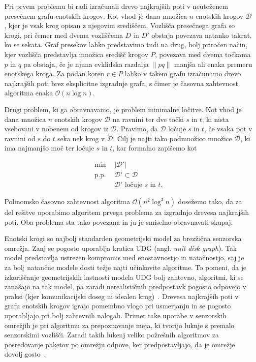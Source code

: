 \documentclass[a4paper, 12pt]{book}
\newcommand{\D}{\ensuremath{\mathcal{D}}}
\newcommand{\OO}{\ensuremath{\mathcal{O}}} %
\begin{document}
Pri prvem problemu bi radi izračunali drevo najkrajših poti v neuteženem presečnem grafu enotskih krogov. Kot vhod je dana množica $n$ enotskih krogov $\D$, kjer je vsak krog opisan z njegovim središčem. Vozlišča presečnega grafa so krogi, pri čemer med dvema vozliščema $D$ in $D'$ obstaja povezava natanko takrat, ko se sekata. Graf presekov lahko predstavimo tudi na drug, bolj priročen način, kjer vozlišča predstavlja množica središč krogov $P$, povezava med dvema točkama $p$ in $q$ pa obstaja, če je njuna evklidska razdalja $\|pq\|$ manjša ali enaka premeru enotskega kroga. Za podan koren $r \in P$ lahko v takem grafu izračunamo drevo najkrajših poti brez eksplicitne izgradnje grafa, s čimer je časovna zahtevnost algoritma enaka $\OO(n\log n)$.

Drugi problem, ki ga obravnavamo, je problem minimalne ločitve. Kot vhod je dana množica $n$ enotskih krogov $\D$ na ravnini ter dve točki $s$ in $t$, ki nista vsebovani v nobenem od krogov iz $\D$. Pravimo, da $\D$ ločuje $s$ in $t$, če vsaka pot v ravnini od $s$ do $t$ seka nek krog v $\D$. Cilj je najti tako podmnožico množice $\D$, ki ima najmanjšo moč ter ločuje $s$ in $t$, kar formalno zapišemo kot 

\begin{align*}
	\min ~~		& |\D'|\\
	 \mbox{p.p.}~~ & \D'\subset \D\\
				&	\D'\text{ ločuje $s$ in $t$}. 
\end{align*}

Polinomsko časovno zahtevnost algoritma $\OO(n^2\log^3n)$ dosežemo tako, da za del rešitve uporabimo algoritem prvega problema za izgradnjo drevesa najkrajših poti. Oba problema sta tako povezana in ju je smiselno obravnavati skupaj.

Enotski krogi so najbolj standarden geometrijski model za brezžična senzorska omrežja. Zanj se pogosto uporablja kratica UDG (angl. \textit{unit disk graph}). Tak model predstavlja ustrezen kompromis med enostavnostjo in natačnostjo, saj je za bolj natančne modele dosti težje najti učinkovite algoritme. To pomeni, da je izkoriščanje geometrijskih lastnosti modela UDG bolj zahtevno, algoritmi, ki se zanašajo na tak model, pa zaradi nerealističnih predpostavk pogosto odpovejo v praksi (kjer komunikacijski doseg ni idealen krog)~\cite{WGM06}. Drevesa najkrajših poti v grafu enotskih krogov igrajo pomembno vlogo pri usmerjanju in se pogosto uporabljajo pri bolj zahtevnih nalogah. Primer take uporabe v senzorskih omrežjih je pri algoritmu za prepoznavanje meja, ki tvorijo luknje s premalo senzorskimi vozlišči. Zaradi takih lukenj veliko požrešnih algoritmov za posredovanje paketov po omrežju odpove, ker predpostavljajo, da je omrežje dovolj gosto~\cite{FGG06}.
\end{document}
